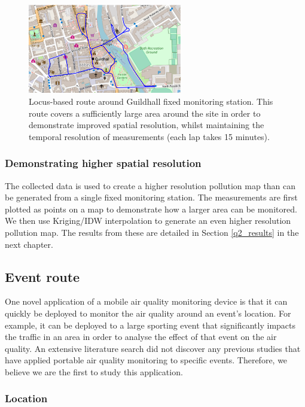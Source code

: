 \documentclass[11pt]{report}
\begin{document}
\begin{figure}[!tb]
\centering
\includegraphics[width=0.6\textwidth]{images/locus_route}
\caption[Locus-based route.]{Locus-based route around Guildhall fixed monitoring station. This route covers a sufficiently large area around the site in order to demonstrate improved spatial resolution, whilst maintaining the temporal resolution of measurements (each lap takes 15 minutes).}
\label{fig: locus_route}
\end{figure}

\subsubsection{Demonstrating higher spatial resolution}

The collected data is used to create a higher resolution pollution map than can be generated from a single fixed monitoring station. The measurements are first plotted as points on a map to demonstrate how a larger area can be monitored. We then use Kriging/IDW interpolation to generate an even higher resolution pollution map. The results from these are detailed in Section \ref{q2_results} in the next chapter.


\subsection{Event route} \label{sec:event}

One novel application of a mobile air quality monitoring device is that it can quickly be deployed to monitor the air quality around an event's location. For example, it can be deployed to a large sporting event that significantly impacts the traffic in an area in order to analyse the effect of that event on the air quality. An extensive literature search did not discover any previous studies that have applied portable air quality monitoring to specific events. Therefore, we believe we are the first to study this application.

\subsubsection{Location}
\end{document}
